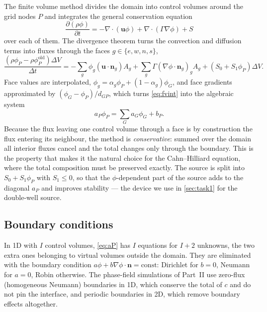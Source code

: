 \documentclass[11pt,a4paper]{article}
\numberwithin{equation}{section}
\theoremstyle{remark}
\newcommand{\bn}{\bm{n}}
\newcommand{\bu}{\bm{u}}
\begin{document}
The finite volume method divides the domain into control volumes around the grid nodes $P$ and
integrates the general conservation equation
\begin{equation}\label{eq:general}
  \frac{\partial(\rho\phi)}{\partial t} = -\nabla\cdot(\bu\phi) + \nabla\cdot(\Gamma\nabla\phi) + S
\end{equation}
over each of them. The divergence theorem turns the convection and diffusion terms into fluxes through
the faces $g \in \{e,w,n,s\}$,
\begin{equation}\label{eq:fvint}
  \frac{(\rho\phi_P - \rho\phi_P^{\mathrm{old}})\Delta V}{\Delta t}
  = -\sum_g\phi_g(\bu\cdot\bn_g)A_g + \sum_g\Gamma(\nabla\phi\cdot\bn_g)_gA_g + (S_0 + S_1\phi_P)\Delta V.
\end{equation}
Face values are interpolated, $\phi_g = \alpha_g\phi_P + (1-\alpha_g)\phi_G$, and face gradients
approximated by $(\phi_G - \phi_P)/d_{GP}$, which turns \cref{eq:fvint} into the algebraic system
\begin{equation}\label{eq:aP}
  a_P\phi_P = \sum_G a_G\phi_G + b_P .
\end{equation}
Because the flux leaving one control volume through a face is by construction the flux entering its
neighbour, the method is \emph{conservative}: summed over the domain all interior fluxes cancel and
the total changes only through the boundary. This is the property that makes it the natural choice
for the Cahn--Hilliard equation, where the total composition must be preserved exactly. The source is
split into $S_0 + S_1\phi_P$ with $S_1 \le 0$, so that the $\phi$-dependent part of the source adds to
the diagonal $a_P$ and improves stability --- the device we use in \cref{sec:task1} for the
double-well source.

\subsection{Boundary conditions}\label{sec:fvbc}

In 1D with $I$ control volumes, \cref{eq:aP} has $I$ equations for $I+2$ unknowns, the two extra
ones belonging to virtual volumes outside the domain. They are eliminated with the boundary condition
$a\phi + b\nabla\phi\cdot\bn = \text{const}$: Dirichlet for $b = 0$, Neumann for $a = 0$, Robin
otherwise. The phase-field simulations of Part~II use zero-flux (homogeneous Neumann) boundaries in 1D,
which conserve the total of $c$ and do not pin the interface, and periodic boundaries in 2D, which
remove boundary effects altogether.
\end{document}
